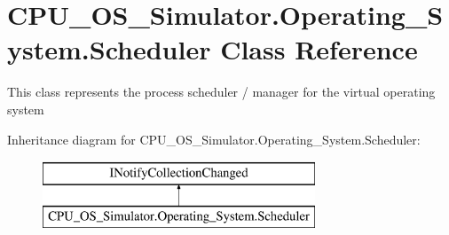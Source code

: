 \hypertarget{class_c_p_u___o_s___simulator_1_1_operating___system_1_1_scheduler}{}\section{C\+P\+U\+\_\+\+O\+S\+\_\+\+Simulator.\+Operating\+\_\+\+System.\+Scheduler Class Reference}
\label{class_c_p_u___o_s___simulator_1_1_operating___system_1_1_scheduler}


This class represents the process scheduler / manager for the virtual operating system  


Inheritance diagram for C\+P\+U\+\_\+\+O\+S\+\_\+\+Simulator.\+Operating\+\_\+\+System.\+Scheduler\+:\begin{figure}[H]
\begin{center}
\leavevmode
\includegraphics[height=2.000000cm]{class_c_p_u___o_s___simulator_1_1_operating___system_1_1_scheduler}
\end{center}
\end{figure}
